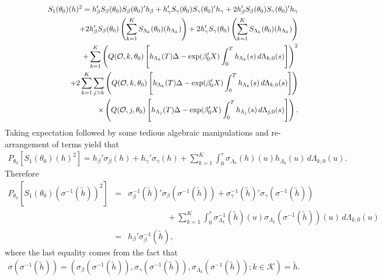 \documentclass{statsoc}
\begin{document}
\begin{eqnarray*}
&&S_1(\theta_0)(h)^2=h_\beta'S_\beta(\theta_0)S_\beta(\theta_0)'h_\beta+h_\gamma'S_\gamma(\theta_0)S_\gamma(\theta_0)'h_\gamma+2h_\beta'S_\beta(\theta_0)S_\gamma(\theta_0)'h_\gamma\\
&&\hspace{2.5cm}+2h_\beta'S_\beta(\theta_0)\left(\sum_{k=1}^K S_{\Lambda_k}(\theta_0)(h_{\Lambda_k})\right)+2h_\gamma'S_\gamma(\theta_0)\left(\sum_{k=1}^K S_{\Lambda_k}(\theta_0)(h_{\Lambda_k})\right)\\
&&\hspace{2.5cm}+\sum_{k=1}^K\left(Q(\mathcal O,k,\theta_0)\left[h_{\Lambda_k}(T)\Delta-\exp(\beta_0'X)\int_0^{T}h_{\Lambda_k}(s)\,d\Lambda_{k,0}(s)\right]\right)^2\\
&&\hspace{2.5cm}+2\sum_{k=1}^K\sum_{j>k}\left(Q(\mathcal O,k,\theta_0)\left[h_{\Lambda_k}(T)\Delta-\exp(\beta_0'X)\int_0^{T}h_{\Lambda_k}(s)\,d\Lambda_{k,0}(s)\right]\right)
\\
&&\hspace{4cm}\times
\left(Q(\mathcal O,j,\theta_0)\left[h_{\Lambda_j}(T)\Delta-\exp(\beta_0'X)\int_0^{T}h_{\Lambda_j}(s)\,d\Lambda_{j,0}(s)\right]\right).
\end{eqnarray*}
Taking expectation followed by some tedious algebraic manipulations and re-arrangement of terms yield that
\begin{eqnarray*}
P_{\theta_0} \left[S_1(\theta_0)(h)^2 \right]=h_\beta'\sigma_\beta(h)+h_\gamma'\sigma_\gamma(h)+\sum_{k=1}^K\int_0^\tau\sigma_{\Lambda_k}(h)(u)h_{\Lambda_k}(u)\,d\Lambda_{k,0}(u).
\end{eqnarray*}
Therefore
\begin{eqnarray*}
P_{\theta_0} \left[ S_1(\theta_0) (\sigma^{-1}(\widetilde h))^2\right]&=&\sigma_\beta^{-1}(\widetilde h)'\sigma_\beta(\sigma^{-1}(\widetilde h))+\sigma_\gamma^{-1}(\widetilde h)'\sigma_\gamma(\sigma^{-1}(\widetilde h))\\
&&\hspace{2cm}+\sum_{k=1}^K\int_0^\tau \sigma_{\Lambda_k}^{-1}(\widetilde h)(u) \sigma_{\Lambda_k} (\sigma^{-1}(\widetilde h))(u)\,d\Lambda_{k,0}(u)\\
&=&h_\beta'\sigma_\beta^{-1}(\widetilde h),
\end{eqnarray*}
where the last equality comes from the fact that
\begin{eqnarray*}
\sigma(\sigma^{-1}(\widetilde h))=(\sigma_\beta (\sigma^{-1}( \widetilde h)), \sigma_\gamma (\sigma^{-1}(\widetilde h)), \sigma_{\Lambda_k}(\sigma^{-1}(\widetilde h));k\in\mathcal K)=\widetilde h.
\end{eqnarray*}
\end{document}
